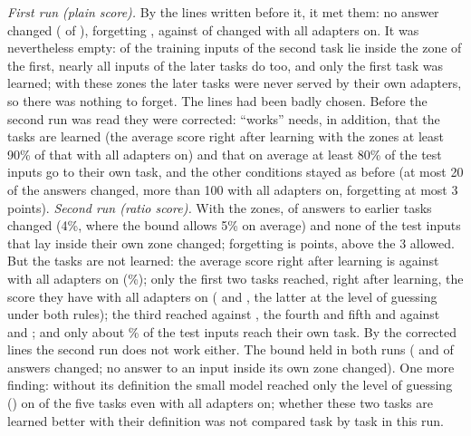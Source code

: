 \emph{First run (plain score).} By the lines written before it, it met them: no answer changed (\BoundBPlainChanged{} of \BoundBCompared{}), forgetting \BoundBPlainFT{}, against \BoundBAllChanged{} of \BoundBCompared{} changed with all adapters on. It was nevertheless empty: \BoundBPlainFirstTrainBlocked{} of the \BoundBTrain{} training inputs of the second task lie inside the zone of the first, nearly all inputs of the later tasks do too, and only the first task was learned; with these zones the later tasks were never served by their own adapters, so there was nothing to forget.
The lines had been badly chosen. Before the second run was read they were corrected: ``works'' needs, in addition, that the tasks are learned (the average score right after learning with the zones at least 90\% of that with all adapters on) and that on average at least 80\% of the test inputs go to their own task, and the other conditions stayed as before (at most 20 of the \BoundBCompared{} answers changed, more than 100 with all adapters on, forgetting at most 3 points).
\emph{Second run (ratio score).} With the zones, \BoundBRatioChanged{} of \BoundBCompared{} answers to earlier tasks changed (4\%, where the bound allows 5\% on average) and none of the \BoundBRatioInside{} test inputs that lay inside their own zone changed; forgetting is \BoundBRatioFT{} points, above the 3 allowed. But the tasks are not learned: the average score right after learning is \BoundBRatioLearned{} against \BoundBAllLearned{} with all adapters on (\BoundBRatioRatioToAll{}\%); only the first two tasks reached, right after learning, the score they have with all adapters on (\BoundBRatioScoreOne{} and \BoundBRatioScoreTwo{}, the latter at the level of guessing under both rules); the third reached \BoundBRatioScoreThree{} against \BoundBAllScoreThree{}, the fourth and fifth \BoundBRatioScoreFour{} and \BoundBRatioScoreFive{} against \BoundBAllScoreFour{} and \BoundBAllScoreFive{}; and only about \BoundBRatioOwn{}\% of the test inputs reach their own task. By the corrected lines the second run does not work either.
The bound held in both runs (\BoundBPlainChanged{} and \BoundBRatioChanged{} of \BoundBCompared{} answers changed; no answer to an input inside its own zone changed). One more finding: without its definition the small model reached only the level of guessing (\BoundBAllGuessScore{}) on \BoundBAllGuess{} of the five tasks even with all adapters on; whether these two tasks are learned better with their definition was not compared task by task in this run.

